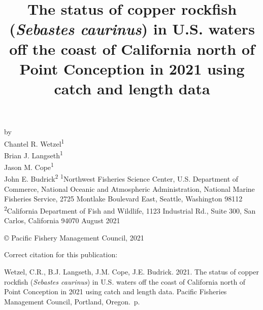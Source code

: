\documentclass[11pt,
  english,
  a4paper,
]{article}
\date{}
\newcommand{\trTitle}{The status of copper rockfish (\emph{Sebastes caurinus}) in U.S. waters off the coast of California north of Point Conception in 2021 using catch and length data}
\newcommand{\trYear}{2021}
\newcommand{\trMonth}{August}
\newcommand{\trAuthsBack}{Wetzel, C.R., B.J. Langseth, J.M. Cope, J.E. Budrick}
\newcommand{\trCitation}{
\begin{hangparas}{1em}{1}
\trAuthsBack{}. \trYear{}. \trTitle{}. Pacific Fisheries Management Council, Portland, Oregon. \pageref{LastPage}{}\,p.
\end{hangparas}}
\begin{document}

\renewcommand*{\thefootnote}{\fnsymbol{footnote}}

\small
\thispagestyle{empty}
\noindent
\begin{center}
\title{The status of copper rockfish (\emph{Sebastes caurinus}) in U.S. waters off the coast of California north of Point Conception in 2021 using catch and length data}
\vspace{1.5cm}
{\Large\textbf{}}
\vfill
by\\
Chantel R. Wetzel\textsuperscript{1}\\
Brian J. Langseth\textsuperscript{1}\\
Jason M. Cope\textsuperscript{1}\\
John E. Budrick\textsuperscript{2}\vfill
\textsuperscript{1}Northwest Fisheries Science Center, U.S. Department of Commerce, National Oceanic and Atmospheric Administration, National Marine Fisheries Service, 2725 Montlake Boulevard East, Seattle, Washington 98112\\
\textsuperscript{2}California Department of Fish and Wildlife, 1123 Industrial Rd., Suite 300, San Carlos, California 94070\vfill
\trMonth{} \trYear{}
\end{center}
\clearpage

\thispagestyle{empty}
\vspace*{\fill}
\begin{center}
\copyright{} Pacific Fishery Management Council, \trYear{}\\
\end{center}
\par
\bigskip
\noindent
Correct citation for this publication:
\bigskip
\par
\trCitation{}
\clearpage


\tableofcontents\clearpage
\label{TRlastRoman}
\clearpage

\newpage
\thispagestyle{empty} %
\end{document}
